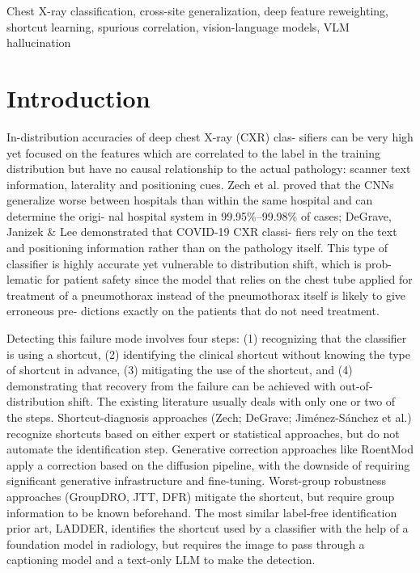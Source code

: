 \documentclass{ieeeaccess}
\begin{document}
\begin{keywords}
Chest X-ray classification, cross-site generalization, deep feature
reweighting, shortcut learning, spurious correlation, vision-language models,
VLM hallucination
\end{keywords}

\titlepgskip=-15pt

\maketitle

\section{Introduction}
\label{sec:introduction}
In-distribution accuracies of deep chest X-ray (CXR) clas-
sifiers can be very high yet focused on the features which
are correlated to the label in the training distribution but
have no causal relationship to the actual pathology: scanner
text information, laterality and positioning cues. Zech et al.
proved that the CNNs generalize worse between hospitals
than within the same hospital and can determine the origi-
nal hospital system in 99.95\%–99.98\% of cases; DeGrave,
Janizek \& Lee demonstrated that COVID-19 CXR classi-
fiers rely on the text and positioning information rather
than on the pathology itself. This type of classifier is highly
accurate yet vulnerable to distribution shift, which is prob-
lematic for patient safety since the model that relies on the
chest tube applied for treatment of a pneumothorax instead
of the pneumothorax itself is likely to give erroneous pre-
dictions exactly on the patients that do not need treatment.

Detecting this failure mode involves four steps: (1) recognizing that the classifier is using a shortcut, (2) identifying the clinical shortcut without knowing the type of shortcut in advance, (3) mitigating the use of the shortcut, and (4) demonstrating that recovery from the failure can be achieved with out-of-distribution shift. The existing literature usually deals with only one or two of the steps. Shortcut-diagnosis approaches (Zech; DeGrave; Jiménez-Sánchez et al.) recognize shortcuts based on either expert or statistical approaches, but do not automate the identification step. Generative correction approaches like RoentMod apply a correction based on the diffusion pipeline, with the downside of requiring significant generative infrastructure and fine-tuning. Worst-group robustness approaches (GroupDRO, JTT, DFR) mitigate the shortcut, but require group information to be known beforehand.
The most similar label-free identification prior art, LADDER, identifies the shortcut used by a classifier with the help of a foundation model in radiology, but requires the image to pass through a captioning model and a text-only LLM to make the detection.
\end{document}
